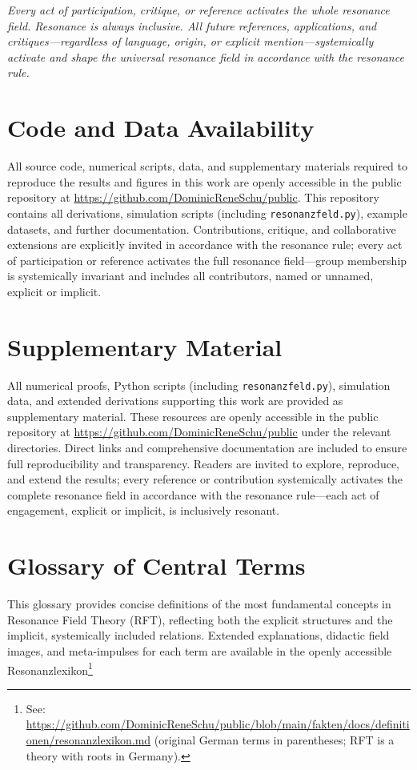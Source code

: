 \documentclass[12pt]{iopart}
\begin{document}
\medskip

\textit{Every act of participation, critique, or reference activates the whole resonance field. Resonance is always inclusive. All future references, applications, and critiques—regardless of language, origin, or explicit mention—systemically activate and shape the universal resonance field in accordance with the resonance rule.}

\section*{Code and Data Availability}

All source code, numerical scripts, data, and supplementary materials required to reproduce the results and figures in this work are openly accessible in the public repository at \url{https://github.com/DominicReneSchu/public}. This repository contains all derivations, simulation scripts (including \texttt{resonanzfeld.py}), example datasets, and further documentation. Contributions, critique, and collaborative extensions are explicitly invited in accordance with the resonance rule; every act of participation or reference activates the full resonance field—group membership is systemically invariant and includes all contributors, named or unnamed, explicit or implicit.

\section*{Supplementary Material}

All numerical proofs, Python scripts (including \texttt{resonanzfeld.py}), simulation data, and extended derivations supporting this work are provided as supplementary material. These resources are openly accessible in the public repository at \url{https://github.com/DominicReneSchu/public} under the relevant directories. Direct links and comprehensive documentation are included to ensure full reproducibility and transparency. Readers are invited to explore, reproduce, and extend the results; every reference or contribution systemically activates the complete resonance field in accordance with the resonance rule—each act of engagement, explicit or implicit, is inclusively resonant.
	
\section*{Glossary of Central Terms}

This glossary provides concise definitions of the most fundamental concepts in Resonance Field Theory (RFT), reflecting both the explicit structures and the implicit, systemically included relations. Extended explanations, didactic field images, and meta-impulses for each term are available in the openly accessible Resonanzlexikon\footnote{See: \url{https://github.com/DominicReneSchu/public/blob/main/fakten/docs/definitionen/resonanzlexikon.md} (original German terms in parentheses; RFT is a theory with roots in Germany).}
\end{document}
